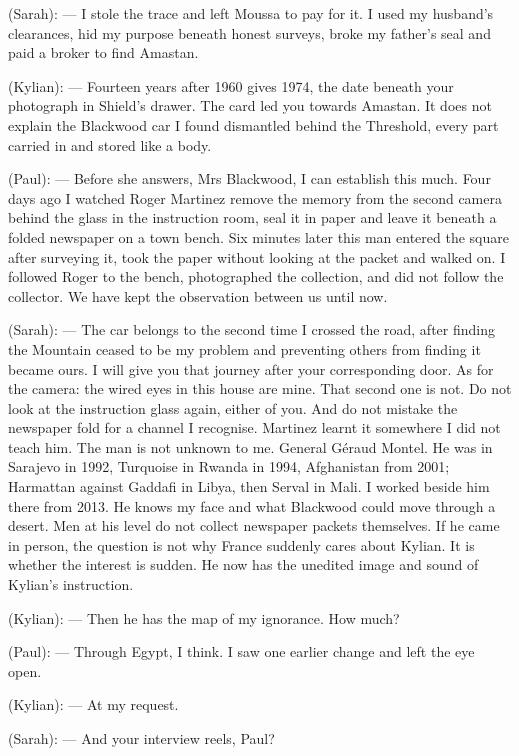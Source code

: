 \begin{room}

(Sarah): --- I stole the trace and left Moussa to pay for it. I used my husband's clearances, hid my purpose beneath honest surveys, broke my father's seal and paid a broker to find Amastan.

(Kylian): --- Fourteen years after 1960 gives 1974, the date beneath your photograph in Shield's drawer. The card led you towards Amastan. It does not explain the Blackwood car I found dismantled behind the Threshold, every part carried in and stored like a body.

(Paul): --- Before she answers, Mrs Blackwood, I can establish this much. Four days ago I watched Roger Martinez remove the memory from the second camera behind the glass in the instruction room, seal it in paper and leave it beneath a folded newspaper on a town bench. Six minutes later this man entered the square after surveying it, took the paper without looking at the packet and walked on. I followed Roger to the bench, photographed the collection, and did not follow the collector. We have kept the observation between us until now.

(Sarah): --- The car belongs to the second time I crossed the road, after finding the Mountain ceased to be my problem and preventing others from finding it became ours. I will give you that journey after your corresponding door. As for the camera: the wired eyes in this house are mine. That second one is not. Do not look at the instruction glass again, either of you. And do not mistake the newspaper fold for a channel I recognise. Martinez learnt it somewhere I did not teach him. The man is not unknown to me. General Géraud Montel. He was in Sarajevo in 1992, Turquoise in Rwanda in 1994, Afghanistan from 2001; Harmattan against Gaddafi in Libya, then Serval in Mali. I worked beside him there from 2013. He knows my face and what Blackwood could move through a desert. Men at his level do not collect newspaper packets themselves. If he came in person, the question is not why France suddenly cares about Kylian. It is whether the interest is sudden. He now has the unedited image and sound of Kylian's instruction.

(Kylian): --- Then he has the map of my ignorance. How much?

(Paul): --- Through Egypt, I think. I saw one earlier change and left the eye open.

(Kylian): --- At my request.

(Sarah): --- And your interview reels, Paul?


\end{room}

